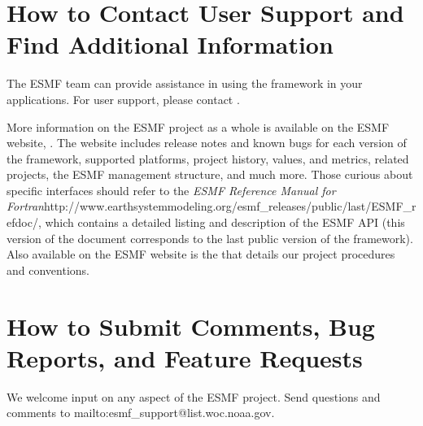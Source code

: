 \section{How to Contact User Support and Find Additional Information}
\label{sec:Support}
The ESMF team can provide assistance in using the framework in your
applications.
For user support, please contact 
.  

More information on the ESMF project as a whole is available on the 
ESMF website, .  
The website includes release notes and known bugs for each version of the
framework, supported platforms, project history, values, and metrics, related projects,
the ESMF management structure, and much more.  Those curious about specific 
interfaces should refer to the \htmladdnormallink
{{\it ESMF Reference Manual for Fortran}}{http://www.earthsystemmodeling.org/esmf_releases/public/last/ESMF\_refdoc/}, which contains a detailed listing and description of 
the ESMF API (this version of the document corresponds to the last public version of the framework).  Also available on the ESMF website is the
that details our project procedures and conventions.

\section{How to Submit Comments, Bug Reports, and Feature Requests}
\label{sec:Submission}
We welcome input on any aspect of the ESMF project.  Send
questions and comments to 
{mailto:esmf\_support@list.woc.noaa.gov}.


